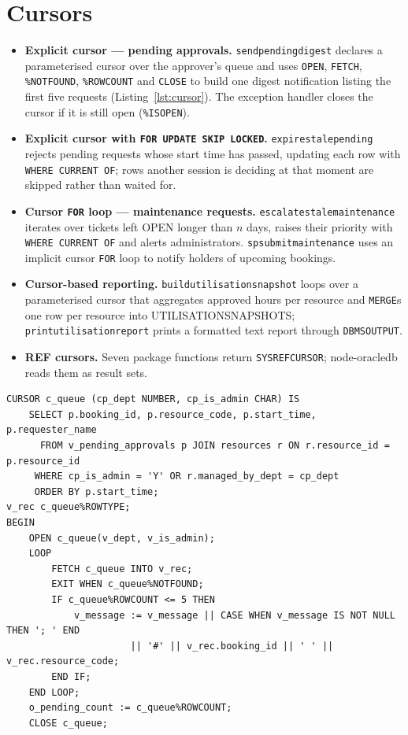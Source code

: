 \documentclass[12pt,a4paper,oneside]{report}
\renewcommand{\_}{\origus\allowbreak}
\begin{document}
\section{Cursors}\label{sec:cur}
\begin{itemize}
  \item \textbf{Explicit cursor --- pending approvals.} \texttt{send\_pending\_digest} declares a parameterised cursor over the approver's queue and uses \texttt{OPEN}, \texttt{FETCH}, \texttt{\%NOTFOUND}, \texttt{\%ROWCOUNT} and \texttt{CLOSE} to build one digest notification listing the first five requests (Listing~\ref{lst:cursor}). The exception handler closes the cursor if it is still open (\texttt{\%ISOPEN}).
  \item \textbf{Explicit cursor with \texttt{FOR UPDATE SKIP LOCKED}.} \texttt{expire\_stale\_pending} rejects pending requests whose start time has passed, updating each row with \texttt{WHERE CURRENT OF}; rows another session is deciding at that moment are skipped rather than waited for.
  \item \textbf{Cursor \texttt{FOR} loop --- maintenance requests.} \texttt{escalate\_stale\_maintenance} iterates over tickets left OPEN longer than $n$ days, raises their priority with \texttt{WHERE CURRENT OF} and alerts administrators. \texttt{sp\_submit\_maintenance} uses an implicit cursor \texttt{FOR} loop to notify holders of upcoming bookings.
  \item \textbf{Cursor-based reporting.} \texttt{build\_utilisation\_snapshot} loops over a parameterised cursor that aggregates approved hours per resource and \texttt{MERGE}s one row per resource into UTILISATION\_SNAPSHOTS; \texttt{print\_utilisation\_report} prints a formatted text report through \texttt{DBMS\_OUTPUT}.
  \item \textbf{REF cursors.} Seven package functions return \texttt{SYS\_REFCURSOR}; node-oracledb reads them as result sets.
\end{itemize}

\begin{lstlisting}[language=PLSQL,caption={Explicit cursor in send\_pending\_digest (excerpt)},label=lst:cursor]
CURSOR c_queue (cp_dept NUMBER, cp_is_admin CHAR) IS
    SELECT p.booking_id, p.resource_code, p.start_time, p.requester_name
      FROM v_pending_approvals p JOIN resources r ON r.resource_id = p.resource_id
     WHERE cp_is_admin = 'Y' OR r.managed_by_dept = cp_dept
     ORDER BY p.start_time;
v_rec c_queue%ROWTYPE;
BEGIN
    OPEN c_queue(v_dept, v_is_admin);
    LOOP
        FETCH c_queue INTO v_rec;
        EXIT WHEN c_queue%NOTFOUND;
        IF c_queue%ROWCOUNT <= 5 THEN
            v_message := v_message || CASE WHEN v_message IS NOT NULL THEN '; ' END
                      || '#' || v_rec.booking_id || ' ' || v_rec.resource_code;
        END IF;
    END LOOP;
    o_pending_count := c_queue%ROWCOUNT;
    CLOSE c_queue;
\end{lstlisting}
\end{document}
